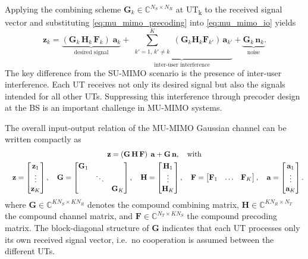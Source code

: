 Applying the combining scheme $\mathbf{G}_k \in \mathbb{C}^{N_S \times N_R}$ at \ac{UT}\textsubscript{k} to the received signal vector and substituting \eqref{eq:mu_mimo_precoding} into \eqref{eq:mu_mimo_io} yields
\begin{equation}
\label{eq:mu_mimo_precoding_combining_io}
    \mathbf{z}_k 
    = \underbrace{\left(\mathbf{G}_k \, \mathbf{H}_k \, \mathbf{F}_k\right) \; \mathbf{a}_k}_{\text{desired signal}}
    + \underbrace{\sum_{\substack{k'=1, \, k'\neq k}}^{K} \left(\mathbf{G}_k \mathbf{H}_k \mathbf{F}_{k'}\right) \, \mathbf{a}_{k'}}_{\text{inter-user interference}} 
    + \underbrace{\mathbf{G}_k \, \mathbf{n}_k}_{\text{noise}}.
\end{equation}
The key difference from the \ac{SU}-\ac{MIMO} scenario is the presence of inter-user interference. Each \ac{UT} receives not only its desired signal but also the signals intended for all other \acp{UT}. Suppressing this interference through precoder design at the \ac{BS} is an important challenge in \ac{MU}-\ac{MIMO} systems.

The overall input-output relation of the \ac{MU}-\ac{MIMO} Gaussian channel can be written compactly as
\begin{gather}
\label{eq:mu_mimo_precoding_combining_io_compact}
    \mathbf{z} = \left(\mathbf{G} \, \mathbf{H} \, \mathbf{F}\right) \; \mathbf{a} + \mathbf{G} \, \mathbf{n}, \quad \text{with} \\
    \quad \mathbf{z} = \begin{bmatrix} \mathbf{z}_1 \\ \vdots \\ \mathbf{z}_K \end{bmatrix},
    \quad \mathbf{G} = \begin{bmatrix} \mathbf{G}_1 & & \\ & \ddots & \\ & & \mathbf{G}_K \end{bmatrix},
    \quad \mathbf{H} = \begin{bmatrix} \mathbf{H}_1 \\ \vdots \\ \mathbf{H}_K \end{bmatrix}, 
    \quad \mathbf{F} = \begin{bmatrix} \mathbf{F}_1 & \dots & \mathbf{F}_K \end{bmatrix}, 
    \quad \mathbf{a} = \begin{bmatrix} \mathbf{a}_1 \\ \vdots \\ \mathbf{a}_K \end{bmatrix}. \notag
\end{gather}
where $\mathbf{G} \in \mathbb{C}^{K N_S \times K N_R}$ denotes the compound combining matrix, $\mathbf{H} \in \mathbb{C}^{K N_R \times N_T}$ the compound channel matrix, and $\mathbf{F} \in \mathbb{C}^{N_T \times K N_S}$ the compound precoding matrix.
The block-diagonal structure of $\mathbf{G}$ indicates that each \ac{UT} processes only its own received signal vector, i.e.\ no cooperation is assumed between the different \acp{UT}.


